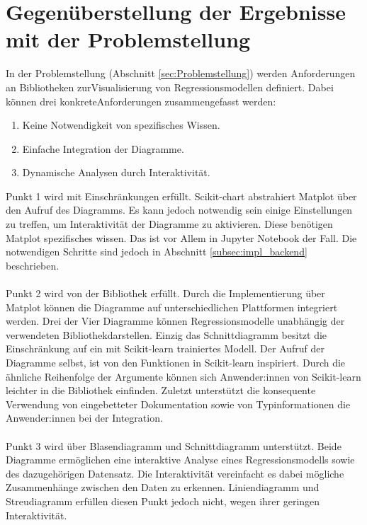 \section{Gegenüberstellung der Ergebnisse mit der Problemstellung}
\label{sec:eval_problemstellung}

In der Problemstellung (Abschnitt \ref{sec:Problemstellung}) werden Anforderungen an Bibliotheken zur\linebreak Visualisierung von Regressionsmodellen definiert. Dabei können drei konkrete\linebreak Anforderungen zusammengefasst werden:
\begin{enumerate}
    \item Keine Notwendigkeit von spezifisches Wissen.
    \item Einfache Integration der Diagramme.
    \item Dynamische Analysen durch Interaktivität.
\end{enumerate}

\vspace{\baselineskip}

\noindent Punkt 1 wird mit Einschränkungen erfüllt. Scikit-chart abstrahiert Matplot über den Aufruf des Diagramms. Es kann jedoch notwendig sein einige Einstellungen zu treffen, um Interaktivität der Diagramme zu aktivieren. Diese benötigen Matplot spezifisches wissen. Das ist vor Allem in Jupyter Notebook der Fall. Die notwendigen Schritte sind jedoch in Abschnitt \ref{subsec:impl_backend} beschrieben.\\\\
\noindent Punkt 2 wird von der Bibliothek erfüllt. Durch die Implementierung über Matplot können die Diagramme auf unterschiedlichen Plattformen integriert werden. Drei der Vier Diagramme können Regressionsmodelle unabhängig der verwendeten Bibliothek\linebreak darstellen. Einzig das Schnittdiagramm besitzt die Einschränkung auf ein mit Scikit-learn trainiertes Modell. Der Aufruf der Diagramme selbst, ist von den Funktionen in Scikit-learn inspiriert. Durch die ähnliche Reihenfolge der Argumente können sich Anwender:innen von Scikit-learn leichter in die Bibliothek einfinden. Zuletzt unterstützt die konsequente Verwendung von eingebetteter Dokumentation sowie von Typinformationen die Anwender:innen bei der Integration.\\\\
\noindent Punkt 3 wird über Blasendiagramm und Schnittdiagramm unterstützt. Beide Diagramme ermöglichen eine interaktive Analyse eines Regressionsmodells sowie des dazugehörigen Datensatz. Die Interaktivität vereinfacht es dabei mögliche Zusammenhänge zwischen den Daten zu erkennen. Liniendiagramm und Streudiagramm erfüllen diesen Punkt jedoch nicht, wegen ihrer geringen Interaktivität.

